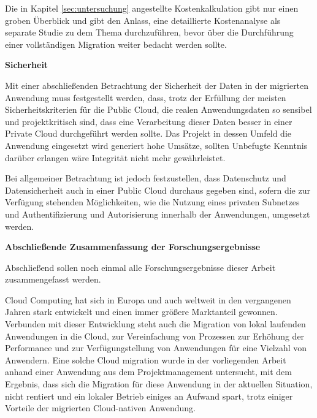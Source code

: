 Die in Kapitel \ref{sec:untersuchung} angestellte Kostenkalkulation gibt nur einen groben Überblick und gibt den Anlass, eine detaillierte Kostenanalyse als separate Studie zu dem Thema durchzuführen, bevor über die Durchführung einer vollständigen Migration weiter bedacht werden sollte.

\textbf{Sicherheit}

Mit einer abschließenden Betrachtung der Sicherheit der Daten in der migrierten Anwendung muss festgestellt werden, dass, trotz der Erfüllung der meisten Sicherheitskriterien für die Public Cloud, die realen Anwendungsdaten so sensibel und projektkritisch sind, dass eine Verarbeitung dieser Daten besser in einer Private Cloud durchgeführt werden sollte. Das Projekt in dessen Umfeld die Anwendung eingesetzt wird generiert hohe Umsätze, sollten Unbefugte Kenntnis darüber erlangen wäre Integrität nicht mehr gewährleistet.

Bei allgemeiner Betrachtung ist jedoch festzustellen, dass Datenschutz und Datensicherheit auch in einer Public Cloud durchaus gegeben sind, sofern die zur Verfügung stehenden Möglichkeiten, wie die Nutzung eines privaten Subnetzes und Authentifizierung und Autorisierung innerhalb der Anwendungen, umgesetzt werden.

\textbf{Abschließende Zusammenfassung der Forschungsergebnisse}

Abschließend sollen noch einmal alle Forschungsergebnisse dieser Arbeit zusammengefasst werden.

Cloud Computing hat sich in Europa und auch weltweit in den vergangenen Jahren stark entwickelt und einen immer größere Marktanteil gewonnen. Verbunden mit dieser Entwicklung steht auch die Migration von lokal laufenden Anwendungen in die Cloud, zur Vereinfachung von Prozessen zur Erhöhung der Performance und zur Verfügungstellung von Anwendungen für eine Vielzahl von Anwendern. Eine solche Cloud migration wurde in der vorliegenden Arbeit anhand einer Anwendung aus dem Projektmanagement untersucht, mit dem Ergebnis, dass sich die Migration für diese Anwendung in der aktuellen Situation, nicht rentiert und ein lokaler Betrieb einiges an Aufwand spart, trotz einiger Vorteile der migrierten Cloud-nativen Anwendung.